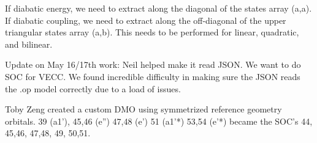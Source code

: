 If diabatic energy, we need to extract along the diagonal of the states array (a,a). 
If diabatic coupling, we need to extract along the off-diagonal of the upper triangular states array (a,b). 
This needs to be performed for linear, quadratic, and bilinear.  

Update on May 16/17th work:
Neil helped make it read JSON. We want to do SOC for VECC. We found incredible difficulty in making sure the JSON reads the .op model correctly due to a load of issues. 








Toby Zeng created a custom DMO using symmetrized reference geometry orbitals. 39 (a1'), 45,46 (e'') 47,48 (e') 51 (a1'*) 53,54 (e'*) became the SOC's 44, 45,46, 47,48, 49, 50,51.


